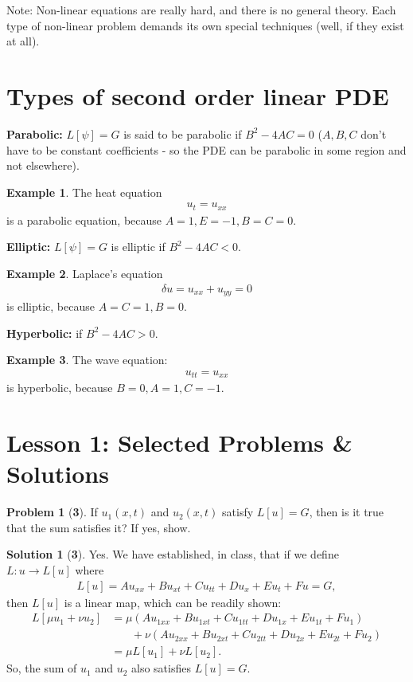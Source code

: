 \documentclass{book}
\theoremstyle{definition}
\newtheorem{exmp}{Example}[section]
\newtheorem*{prob*}{Problem}
\newtheorem*{sln*}{Solution}
\begin{document}
Note: Non-linear equations are really hard, and there is no general theory. Each type of non-linear problem demands its own special techniques (well, if they exist at all). 

\section{Types of second order linear PDE}
\textbf{Parabolic:} $L[\psi] = G$ is said to be parabolic if $B^2 - 4AC = 0$ ($A,B,C$ don't have to be constant coefficients - so the PDE can be parabolic in some region and not elsewhere). 
\begin{exmp}
	The heat equation
	\begin{align*}
	u_t = u_{xx}
	\end{align*}
	is a parabolic equation, because $A=1, E=-1, B=C=0$. 
\end{exmp}

\textbf{Elliptic:} $L[\psi] = G$ is elliptic if $B^2 - 4AC < 0$.
\begin{exmp}
	Laplace's equation
	\begin{align*}
	\delta u = u_{xx} + u_{yy} = 0
	\end{align*}
	is elliptic, because $A=C=1, B=0$.
\end{exmp}

\textbf{Hyperbolic: } if $B^2 - 4AC > 0$.
\begin{exmp}
	The wave equation:\begin{align*}
	u_{tt} = u_{xx}
	\end{align*}
	is hyperbolic, because $B=0, A=1, C=-1$.
\end{exmp}

\newpage

\section{Lesson 1: Selected Problems \& Solutions}
\begin{prob*}[\textbf{3}]
	If $u_1(x,t)$ and $u_2(x,t)$ satisfy $L[u] = G$, then is it true that the sum satisfies it? If yes, show.
	\begin{sln*}[\textbf{3}]
		Yes. We have established, in class, that if we define $L : u \rightarrow L[u]$ where  
		\begin{align*}
		L[u] = Au_{xx} + Bu_{xt} + Cu_{tt} + Du_x + Eu_t + Fu = G,
		\end{align*}
		then $L[u]$ is a linear map, which can be readily shown:
		\begin{align*}
		L[\mu u_1 + \nu u_2 ] &= \mu(Au_{1xx} + Bu_{1xt} + Cu_{1tt} + Du_{1x} + Eu_{1t} + Fu_1) \\
		&\text{ }\,\,\,\,\,\,\,+\nu(Au_{2xx} + Bu_{2xt} + Cu_{2tt} + Du_{2x} + Eu_{2t} + Fu_2)\\
		&= \mu L[u_1] + \nu L[u_2].
		\end{align*}
		So, the sum of $u_1$ and $u_2$ also satisfies $L[u] = G$.
	\end{sln*}
\end{prob*}
\end{document}
